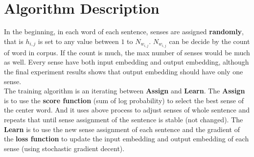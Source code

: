 
\section{Algorithm Description}

In the beginning, in each word of each sentence, senses are assigned \textbf{randomly}, that is $h_{i,j}$ is set to any value between $1$ to $N_{w_{i,j}}$. $N_{w_{i,j}}$ can be decide by the count of word in corpus. If the count is much, the max number of senses would be much as well. Every sense have both input embedding and output embedding, although the final experiment results shows that output embedding should have only one sense.\\

The training algorithm is an iterating between \textbf{Assign} and \textbf{Learn}. The \textbf{Assign} is to use the \textbf{score function} (sum of log probability) to select the best sense of the center word. And it uses above process to adjust senses of whole sentence and repeats that until sense assignment of the sentence is stable (not changed). The \textbf{Learn} is to use the new sense assignment of each sentence and the gradient of the \textbf{loss function} to update the input embedding and output embedding of each sense (using stochastic gradient decent). 

